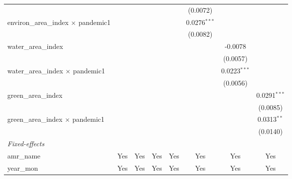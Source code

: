 \begin{table}[htbp]
\begin{tabular}{lccccccc}
                                                 &                &                &                &                & (0.0072)       &                &   \\   
      environ\_area\_index $\times$ pandemic1    &                &                &                &                & 0.0276$^{***}$ &                &   \\   
                                                 &                &                &                &                & (0.0082)       &                &   \\   
      water\_area\_index                         &                &                &                &                &                & -0.0078        &   \\   
                                                 &                &                &                &                &                & (0.0057)       &   \\   
      water\_area\_index $\times$ pandemic1      &                &                &                &                &                & 0.0223$^{***}$ &   \\   
                                                 &                &                &                &                &                & (0.0056)       &   \\   
      green\_area\_index                         &                &                &                &                &                &                & 0.0291$^{***}$\\   
                                                 &                &                &                &                &                &                & (0.0085)\\   
      green\_area\_index $\times$ pandemic1      &                &                &                &                &                &                & 0.0313$^{**}$\\   
                                                 &                &                &                &                &                &                & (0.0140)\\   
      \midrule
      \emph{Fixed-effects}\\
      amr\_name                                  & Yes            & Yes            & Yes            & Yes            & Yes            & Yes            & Yes\\  
      year\_mon                                  & Yes            & Yes            & Yes            & Yes            & Yes            & Yes            & Yes\\  

\end{tabular}
\end{table}
